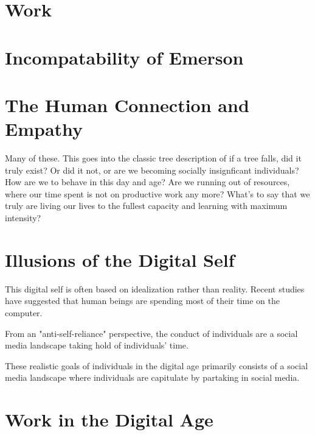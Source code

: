 \documentclass[12pt,letterpaper]{article}
\newif\ifdraft
\begin{document}
\section{Work}
\section{Incompatability of Emerson}

\section{The Human Connection and Empathy}

Many of these.  This goes into the classic tree description of if a tree falls, did it truly exist?  Or did it not, or are we becoming socially insignficant individuals?  How are we to behave in this day and age?  Are we running out of resources, where our time spent is not on productive work any more?  What's to say that we truly are living our lives to the fullest capacity and learning with maximum intensity?
\ifdraft

The pooling of time into interacting with this world is a pooling of life.  Thus, the interaction can be largely interpreted to reside in the minds and hearts of individuals.

Like so, social media usage has only increased in the modern world.  This is quite transparent in the world at large.

The term "digital
age" is an umbrella term that refers to a time period
where interaction with screens is made possible.  That is,
human behavior has been chiefly oriented around consensual
interaction with other human beings.
\fi

\section{Illusions of the Digital Self}
This
digital self is often based on idealization rather than
reality.  Recent studies have suggested that
human beings are spending most of their time on the
computer.

From an "anti-self-reliance" perspective, the conduct of individuals are a
social media landscape taking hold of individuals' time.

These realistic goals of individuals in the
digital age primarily consists of a social media landscape
where individuals are capitulate by partaking in social
media.  


\section{Work in the Digital Age}
\end{document}
